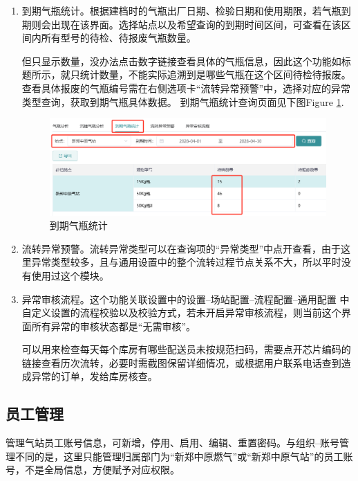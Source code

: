 \documentclass[UTF8]{ctexart}
\begin{document}
\begin{enumerate}
	\item 到期气瓶统计。根据建档时的气瓶出厂日期、检验日期和使用期限，若气瓶到期则会出现在该界面。选择站点以及希望查询的到期时间区间，可查看在该区间内所有型号的待检、待报废气瓶数量。
	
	但只显示数量，没办法点击数字链接查看具体的气瓶信息，因此这个功能如标题所示，就只统计数量，不能实际追溯到是哪些气瓶在这个区间待检待报废。查看具体报废的气瓶编号需在右侧选项卡“流转异常预警”中，选择对应的异常类型查询，获取到期气瓶具体数据。
	到期气瓶统计查询页面见下图Figure \ref{fig:overdue}.
	\begin{figure}[h]
		\centering
		\includegraphics[width=1\textwidth]{dlh_tutorial_figs/overdue}
		\caption{到期气瓶统计}
		\label{fig:overdue}
	\end{figure}
	
	\item 流转异常预警。流转异常类型可以在查询项的“异常类型”中点开查看，由于这里异常类型较多，且与通用设置中的整个流转过程节点关系不大，所以平时没有使用过这个模块。
	
	\item 异常审核流程。这个功能关联设置中的设置--场站配置--流程配置--通用配置 中自定义设置的流程校验以及校验方式，若未开启异常审核流程，则当前这个界面所有异常的审核状态都是“无需审核”。
	
	可以用来检查每天每个库房有哪些配送员未按规范扫码，需要点开芯片编码的链接查看历次流转，必要时需截图保留详细情况，或根据用户联系电话查到造成异常的订单，发给库房核查。
	
	
\end{enumerate}




\subsection{员工管理}

管理气站员工账号信息，可新增，停用、启用、编辑、重置密码。与组织--账号管理不同的是，这里只能管理归属部门为“新郑中原燃气”或“新郑中原气站”的员工账号，不是全局信息，方便赋予对应权限。
\end{document}
